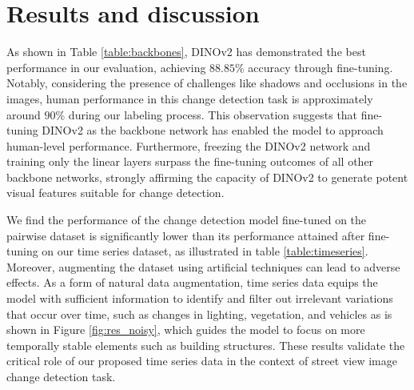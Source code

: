 \documentclass[letterpaper]{article} %
\begin{document}



\section{Results and discussion}
As shown in Table \ref{table:backbones}, DINOv2 has demonstrated the best performance in our evaluation, achieving $88.85\%$ accuracy through fine-tuning. Notably, considering the presence of challenges like shadows and occlusions in the images, human performance in this change detection task is approximately around $90\%$ during our labeling process. This observation suggests that fine-tuning DINOv2 as the backbone network has enabled the model to approach human-level performance. Furthermore, freezing the DINOv2 network and training only the linear layers surpass the fine-tuning outcomes of all other backbone networks, strongly affirming the capacity of DINOv2 to generate potent visual features suitable for change detection. 

We find the performance of the change detection model fine-tuned on the pairwise dataset is significantly lower than its performance attained after fine-tuning on our time series dataset, as illustrated in table \ref{table:timeseries}. 
Moreover, augmenting the dataset using artificial techniques can lead to adverse effects. 
As a form of natural data augmentation, time series data equips the model with sufficient information to identify and filter out irrelevant variations that occur over time, such as changes in lighting, vegetation, and vehicles as is shown in Figure \ref{fig:res_noisy}, which guides the model to focus on more temporally stable elements such as building structures. These results validate the critical role of our proposed time series data in the context of street view image change detection task.
\end{document}
